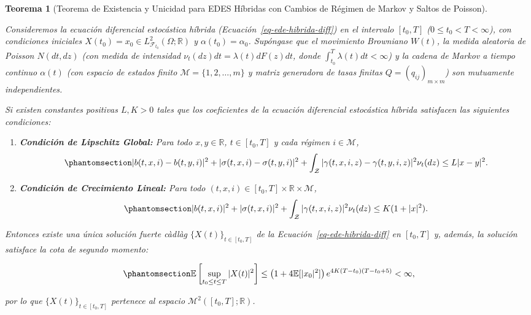 \documentclass[
  spanish,
  us-letterpaper,
]{scrreprt}
\numberwithin{equation}{section}
\theoremstyle{plain}
\newtheorem{theorem}{Teorema}[chapter]
\theoremstyle{plain}
\theoremstyle{plain}
\theoremstyle{definition}
\theoremstyle{remark}
\begin{document}
\begin{theorem}[Teorema de Existencia y Unicidad para EDES Híbridas con
Cambios de Régimen de Markov y Saltos de
Poisson]\protect\hypertarget{thm-mao-switching}{}\label{thm-mao-switching}

Consideremos la ecuación diferencial estocástica híbrida
(Ecuación~\ref{eq-ede-hibrida-diff}) en el intervalo \([t_0, T]\)
(\(0 \le t_0 < T < \infty\)), con condiciones iniciales
\(X(t_0) = x_0 \in L^2_{\mathcal{F}_{t_0}}(\Omega; \mathbb{R})\) y
\(\alpha(t_0) = \alpha_0\). Supóngase que el movimiento Browniano
\(W(t)\), la medida aleatoria de Poisson \(N(dt, dz)\) (con medida de
intensidad \(\nu_t(dz)dt = \lambda(t)dF(z)dt\), donde
\(\displaystyle \int_{t_0}^T \lambda(t)dt < \infty\)) y la cadena de
Markov a tiempo continuo \(\alpha(t)\) (con espacio de estados finito
\(\mathcal{M} = \{1, 2, \dots, m\}\) y matriz generadora de tasas
finitas \(Q = (q_{ij})_{m \times m}\)) son mutuamente independientes.

Si existen constantes positivas \(L, K > 0\) tales que los coeficientes
de la ecuación diferencial estocástica híbrida satisfacen las siguientes
condiciones:

\begin{enumerate}
\def\labelenumi{\arabic{enumi}.}
\item
  \textbf{Condición de Lipschitz Global:} Para todo
  \(x, y \in \mathbb{R}\), \(t \in [t_0, T]\) y cada régimen
  \(i \in \mathcal{M}\),
  \begin{equation}\phantomsection\label{eq-hip-lipschitz-hibrida}{
  \vert b(t, x, i) - b(t, y, i) \vert^2 + \vert \sigma(t, x, i) - \sigma(t, y, i) \vert^2 + \int_{\mathcal{Z}} \vert \gamma(t, x, i, z) - \gamma(t, y, i, z) \vert^2 \nu_t(dz) \le L \vert x - y \vert^2.
  }\end{equation}
\item
  \textbf{Condición de Crecimiento Lineal:} Para todo
  \((t, x, i) \in [t_0, T] \times \mathbb{R} \times \mathcal{M}\),
  \begin{equation}\phantomsection\label{eq-hip-crecimiento-hibrida}{
  \vert b(t, x, i) \vert^2 + \vert \sigma(t, x, i) \vert^2 + \int_{\mathcal{Z}} \vert \gamma(t, x, i, z) \vert^2 \nu_t(dz) \le K (1 + \vert x \vert^2).
  }\end{equation}
\end{enumerate}

Entonces existe una única solución fuerte càdlàg
\(\{X(t)\}_{t \in [t_0, T]}\) de la Ecuación~\ref{eq-ede-hibrida-diff}
en \([t_0, T]\) y, además, la solución satisface la cota de segundo
momento:

\begin{equation}\phantomsection\label{eq-cota-supremo-hibrida}{
\mathbb{E}\left[ \sup_{t_0 \le t \le T} \vert X(t) \vert^2 \right] \le \left( 1 + 4\mathbb{E}[\vert x_0 \vert^2] \right) e^{4K(T - t_0)(T - t_0 + 5)} < \infty,
}\end{equation}

por lo que \(\{X(t)\}_{t \in [t_0, T]}\) pertenece al espacio
\(\mathcal{M}^2([t_0, T]; \mathbb{R})\).

\end{theorem}
\end{document}

